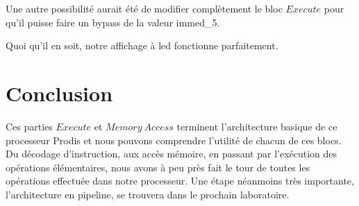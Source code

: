 \documentclass[11pt,a4paper]{article}
\begin{document}
Une autre possibilité aurait été de modifier complètement le bloc $Execute$ pour qu'il puisse faire un bypass de la valeur immed\_5.

Quoi qu'il en soit, notre affichage à led fonctionne parfaitement.

\section{Conclusion}

Ces parties $Execute$ et $Memory\ Access$ terminent l'architecture basique de ce processeur Prodis et nous pouvons comprendre l'utilité de chacun de ces blocs. Du décodage d'instruction, aux accès mémoire, en passant par l'exécution des opérations élémentaires, nous avons à peu près fait le tour de toutes les opérations effectuée dans notre processeur. Une étape néanmoins très importante, l'architecture en pipeline, se trouvera dans le prochain laboratoire.
\end{document}
